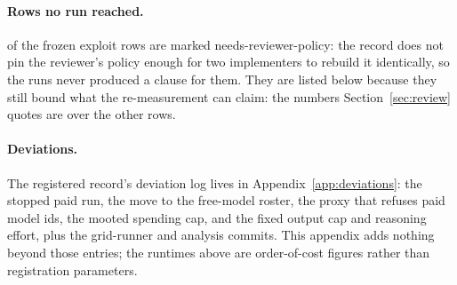\paragraph{Rows no run reached.}
\expExplPolicyOnly{} of the \expExplFrozen{} frozen exploit rows are marked needs-reviewer-policy: the record does not pin the reviewer's policy enough for two implementers to rebuild it identically, so the runs never produced a clause for them. They are listed below because they still bound what the re-measurement can claim: the numbers Section~\ref{sec:review} quotes are over the other \expExplRunRows{} rows.

\begin{center}\small

\end{center}

\paragraph{Deviations.}
The registered record's deviation log lives in Appendix~\ref{app:deviations}: the stopped paid run, the move to the free-model roster, the proxy that refuses paid model ids, the mooted spending cap, and the fixed output cap and reasoning effort, plus the grid-runner and analysis commits. This appendix adds nothing beyond those entries; the runtimes above are order-of-cost figures rather than registration parameters.
